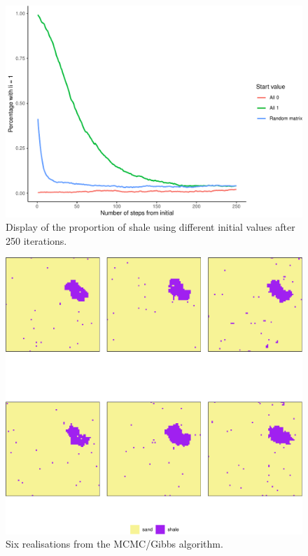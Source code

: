 \documentclass[]{article}
\begin{document}
\begin{figure}
\centering
\includegraphics{Exercise-3_files/figure-latex/fig1c22-1.pdf}
\caption{\label{fig:1c22} Display of the proportion of shale using
different initial values after 250 iterations.}
\end{figure}

\begin{figure}
\centering
\includegraphics{Exercise-3_files/figure-latex/fig1c2-1.pdf}
\caption{\label{fig:c2} Six realisations from the MCMC/Gibbs algorithm.}
\end{figure}
\end{document}
